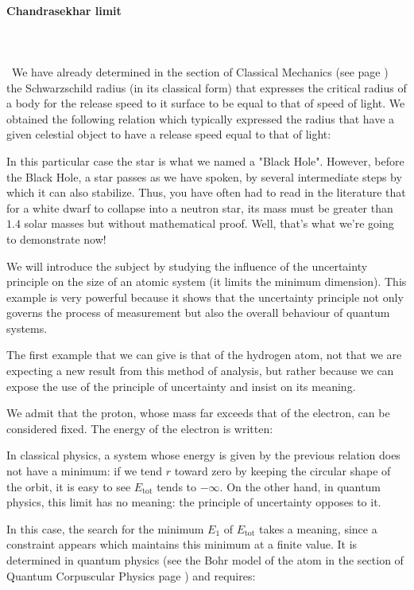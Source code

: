 	\paragraph{Chandrasekhar limit}\mbox{}\\\\\
	We have already determined in the section of Classical Mechanics (see page \pageref{dark star escape velocity}) the Schwarzschild radius (in its classical form) that expresses the critical radius of a body for the release speed to it surface to be equal to that of speed of light. We obtained the following relation which typically expressed the radius that have a given celestial object to have a release speed equal to that of light:
	
	In this particular case the star is what we named a "Black Hole". However, before the Black Hole, a star passes as we have spoken, by several intermediate steps by which it can also stabilize. Thus, you have often had to read in the literature that for a white dwarf to collapse into a neutron star, its mass must be greater than $1.4$ solar masses but without mathematical proof. Well, that's what we're going to demonstrate now!

	We will introduce the subject by studying the influence of the uncertainty principle on the size of an atomic system (it limits the minimum dimension). This example is very powerful because it shows that the uncertainty principle not only governs the process of measurement but also the overall behaviour of quantum systems.
	
	The first example that we can give is that of the hydrogen atom, not that we are expecting a new result from this method of analysis, but rather because we can expose the use of the principle of uncertainty and insist on its meaning.
	
	We admit that the proton, whose mass far exceeds that of the electron, can be considered fixed. The energy of the electron is written:
	
	In classical physics, a system whose energy is given by the previous relation does not have a minimum: if we tend $r$ toward zero by keeping the circular shape of the orbit, it is easy to see $E_\text{tot}$ tends to $-\infty$. On the other hand, in quantum physics, this limit has no meaning: the principle of uncertainty opposes to it.

	In this case, the search for the minimum $E_1$ of $E_\text{tot}$ takes a meaning, since a constraint appears which maintains this minimum at a finite value. It is determined in quantum physics (see the Bohr model of the atom in the section of Quantum Corpuscular Physics page \pageref{bohr model}) and requires:
	
